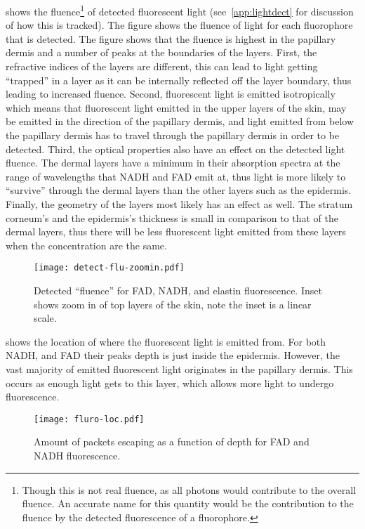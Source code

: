 shows the fluence\footnote{Though this is not real fluence, as all photons would contribute to the overall fluence. An accurate name for this quantity would be the contribution to the fluence by the detected fluorescence of a fluorophore.} of detected fluorescent light (see~\cref{app:lightdect} for discussion of how this is tracked).
The figure shows the fluence of light for each fluorophore that is detected.
The figure shows that the fluence is highest in the papillary dermis and a number of peaks at the boundaries of the layers.
First, the refractive indices of the layers are different, this can lead to light getting ``trapped'' in a layer as it can be internally reflected off the layer boundary, thus leading to increased fluence.
Second, fluorescent light is emitted isotropically which means that fluorescent light emitted in the upper layers of the skin, may be emitted in the direction of the papillary dermis, and light emitted from below the papillary dermis has to travel through the papillary dermis in order to be detected.
Third, the optical properties also have an effect on the detected light fluence.
The dermal layers have a minimum in their absorption spectra at the range of wavelengths that NADH and FAD emit at, thus light is more likely to ``survive'' through the dermal layers than the other layers such as the epidermis.
Finally, the geometry of the layers most likely has an effect as well.
The stratum corneum's and the epidermis's thickness is small in comparison to that of the dermal layers, thus there will be less fluorescent light emitted from these layers when the concentration are the same.

\begin{figure}[!htpb]
    \centering
    \texttt{[image: detect-flu-zoomin.pdf]}
    \caption{Detected ``fluence'' for FAD, NADH, and elastin fluorescence. Inset shows zoom in of top layers of the skin, note the inset is a linear scale.}
    \label{fig:fadnadhboth}
\end{figure}

 shows the location of where the fluorescent light is emitted from.
For both NADH, and FAD their peaks depth is just inside the epidermis.
However, the vast majority of emitted fluorescent light originates in the papillary dermis.
This occurs as enough light gets to this layer, which allows more light to undergo fluorescence. 


\begin{figure}[!htpb]
    \centering
    \texttt{[image: fluro-loc.pdf]}
    \caption{Amount of packets escaping as a function of depth for FAD and NADH fluorescence.}
    \label{fig:floc}
\end{figure}

